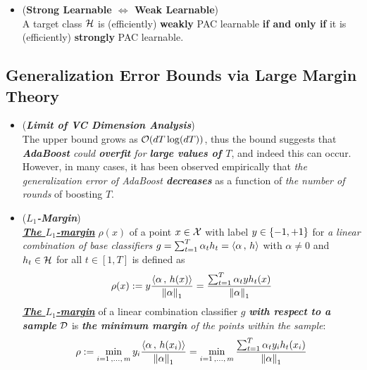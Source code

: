 \documentclass[11pt]{article}
\begin{document}
\begin{itemize}
\item \begin{theorem} (\textbf{Strong Learnable $\Leftrightarrow$ Weak Learnable})  \citep{schapire2012boosting}\\
A target class ${\mathcal H}$ is (efficiently) \textbf{weakly} PAC learnable \textbf{if and only if} it is (efficiently) \textbf{strongly} PAC learnable.
\end{theorem}
\end{itemize}

\subsection{Generalization Error Bounds via Large Margin Theory}
\begin{itemize}
\item \begin{remark}(\emph{\textbf{Limit of VC Dimension Analysis}})\\
The upper bound grows as ${\mathcal O}(dT \log(dT))$, thus the bound suggests that \emph{\textbf{AdaBoost} could \textbf{overfit} for \textbf{large values of $T$}}, and indeed this can occur. However, in many cases, it has been observed empirically that \emph{the generalization error of AdaBoost \textbf{decreases}} as a function of \emph{the number of rounds} of boosting $T$.
\end{remark}

\item \begin{definition} (\textbf{\emph{$L_1$-Margin}}) \citep{mohri2018foundations, schapire2012boosting}\\
\underline{\emph{\textbf{The $L_1$-margin}}} $\rho(x)$ of a point $x \in {\mathcal X}$ with label $y \in \left\{-1, +1\right\}$ for \emph{a linear combination of base classifiers} $g = \sum_{t=1}^{T}\alpha_t h_t = \left\langle \alpha\,,\, h \right\rangle$ with $\alpha \neq 0$ and $h_t \in {\mathcal H}$ for all $t \in [1, T]$ is defined as
\begin{align}
\rho(x) := y \frac{\left\langle \alpha\,,\, h(x) \right\rangle}{\left\|\alpha\right\|_{1}} =  \frac{\sum_{t=1}^{T}\alpha_t y h_t(x)}{\left\|\alpha\right\|_{1}} \label{def: l1_margin}
\end{align} \underline{\emph{\textbf{The $L_1$-margin}}} of a linear combination classifier $g$ \emph{\textbf{with respect to a sample}} ${\mathcal D}$ is \emph{\textbf{the minimum margin} of the points within the sample}:
\begin{align}
\rho := \min_{i=1\,{,}\ldots{,}\, m}y_i \frac{\left\langle \alpha\,,\, h(x_i) \right\rangle}{\left\|\alpha\right\|_{1}} = \min_{i=1\,{,}\ldots{,}\, m} \frac{\sum_{t=1}^{T}\alpha_t y_i  h_t(x_i)}{\left\|\alpha\right\|_{1}} \label{def: l1_margin_sample}
\end{align}
\end{definition}


\end{itemize}
\end{document}
